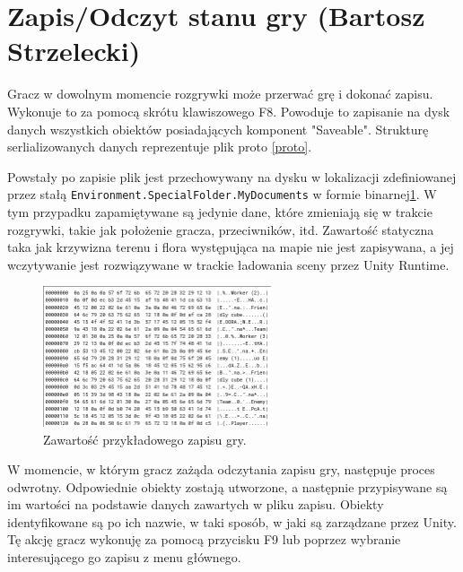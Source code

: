 \section{Zapis/Odczyt stanu gry (Bartosz Strzelecki)}

Gracz w dowolnym momencie rozgrywki może przerwać grę i dokonać zapisu. Wykonuje to
za pomocą skrótu klawiszowego F8. Powoduje to zapisanie na dysk danych wszystkich obiektów posiadających
komponent "Saveable". Strukturę serlializowanych danych reprezentuje plik proto \ref{proto}.


Powstały po zapisie plik jest przechowywany na dysku w lokalizacji zdefiniowanej przez stałą \verb|Environment.SpecialFolder.MyDocuments| w formie binarnej\ref{save}.
W tym przypadku zapamiętywane są jedynie dane, które zmieniają się w trakcie rozgrywki, takie jak położenie gracza, przeciwników, itd. 
Zawartość statyczna taka jak krzywizna terenu i flora występująca na mapie nie jest zapisywana, a jej wczytywanie jest rozwiązywane
w trackie ładowania sceny przez Unity Runtime.

\begin{figure}[h]
\centering
\includegraphics[width=0.6\textwidth]{images/save}
\caption{Zawartość przykładowego zapisu gry.}
\label{save}
\end{figure}

W momencie, w którym gracz zażąda odczytania zapisu gry, następuje proces odwrotny. Odpowiednie obiekty zostają utworzone,
a następnie przypisywane są im wartości na podstawie danych zawartych w pliku zapisu. Obiekty identyfikowane
są po ich nazwie, w taki sposób, w jaki są zarządzane przez Unity.
Tę akcję gracz wykonuję za pomocą przycisku F9 lub poprzez wybranie interesującego go zapisu z menu głównego.

